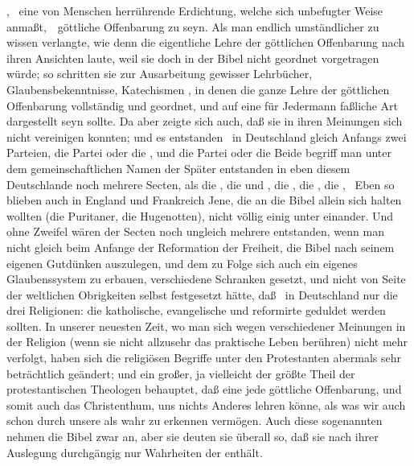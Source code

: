 \begin{aufza}
 , \dh\ eine von Menschen herrührende Erdichtung, welche sich unbefugter Weise anmaßt,~\ göttliche Offenbarung zu seyn. Als man endlich umständlicher zu wissen verlangte, wie denn die eigentliche Lehre der göttlichen Offenbarung nach ihren Ansichten laute, weil sie doch in der Bibel nicht geordnet vorgetragen würde; so schritten sie zur Ausarbeitung gewisser Lehrbücher, Glaubensbekenntnisse, Katechismen \udgl , in denen die ganze Lehre der göttlichen Offenbarung vollständig und geordnet, und auf eine für Jedermann faßliche Art dargestellt seyn sollte. Da aber zeigte sich auch, daß sie in ihren Meinungen sich nicht vereinigen konnten; und es entstanden \zB\ in Deutschland gleich Anfangs zwei Parteien, die Partei  oder die , und die Partei  oder die  Beide begriff man unter dem gemeinschaftlichen Namen der  Später entstanden in eben diesem Deutschlande noch mehrere Secten, als die , die  und , die , die , die , \uam\  Eben so blieben auch in England und Frankreich Jene, die an die Bibel allein sich halten wollten (die Puritaner, die Hugenotten), nicht völlig einig unter einander. Und ohne Zweifel wären der Secten noch ungleich mehrere entstanden, wenn man nicht gleich beim Anfange der Reformation der Freiheit, die Bibel nach seinem eigenen Gutdünken auszulegen, und dem zu Folge sich auch ein eigenes Glaubenssystem zu erbauen, verschiedene Schranken gesetzt, und nicht von Seite der weltlichen Obrigkeiten selbst festgesetzt hätte, daß \zB\ in Deutschland nur die drei Religionen: die katholische, evangelische und reformirte geduldet werden sollten. In unserer neuesten Zeit, wo man sich wegen verschiedener Meinungen in der Religion (wenn sie nicht allzusehr das praktische Leben berühren) nicht mehr verfolgt, haben sich die religiösen Begriffe unter den Protestanten abermals sehr beträchtlich geändert; und ein großer, ja vielleicht der größte Theil der protestantischen Theologen behauptet, daß eine jede göttliche Offenbarung, und somit auch das Christenthum, uns nichts Anderes lehren könne, als was wir auch schon durch unsere  als wahr zu erkennen vermögen. Auch diese sogenannten  nehmen die Bibel zwar an, aber sie deuten sie überall so, daß sie nach ihrer Auslegung durchgängig nur Wahrheiten der  enthält.~
\end{aufza}

